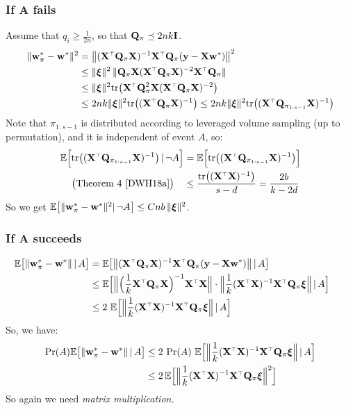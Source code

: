 \documentclass{beamer}
\begin{document}
\begin{frame}
  \frametitle{If A fails}
  Assume that $q_i\geq \frac1{2n}$, so that $\mathbf Q_\pi\preceq 2nk\mathbf I$.
  \begin{align*}
    \|\w_\pi^*-\w^*\|^2
    &= \big\|(\X^\top\Q_\pi\X)^{-1}\X^\top\Q_\pi(\y -
      \X\w^*)\big\|^2\\
    &\leq
      \|\xib\|^2\,\|\Q_\pi\X(\X^\top\Q_\pi\X)^{-2}\X^\top\Q_\pi\|\\
    &\leq
      \|\xib\|^2\tr\big(\X^\top\Q_\pi^2\X(\X^\top\Q_\pi\X)^{-2}\big)\\
    &\leq 2nk  \|\xib\|^2\tr\big((\X^\top\Q_\pi\X)^{-1}\big)
      \leq 2nk  \|\xib\|^2\tr\big((\X^\top\Q_{\pi_{1:s-1}}\X)^{-1}\big)
  \end{align*}
  Note that $\pi_{1:s-1}$ is distributed according to leveraged volume
sampling (up to permutation), and it is independent of event $A$, so:
\begin{align*}
  \E\Big[\tr\big((\X^\top\Q_{\pi_{1:s-1}}\X)^{-1}\big)\,|\,\neg A\Big]
  &=\E\Big[\tr\big((\X^\top\Q_{\pi_{1:s-1}}\X)^{-1}\big)\Big]\\
\big(\text{Theorem 4 [DWH18a]}\big)\quad  &\leq \frac{\tr\big((\X^\top\X)^{-1}\big)}{s-d}= \frac{2b}{k-2d}
\end{align*}
So we get $\mathbb E\big[\|\mathbf w_\pi^*-\mathbf w^*\|^2|\,\neg A\big]\leq Cnb\,\|\boldsymbol\xi\|^2$.
\end{frame}

\begin{frame}
  \frametitle{If A succeeds}
  \begin{align*}
\hspace{-6mm}    \E\big[\|\w_\pi^*-\w^*\|\,|\,A\big]
    &= \E\big[\big\|(\X^\top\Q_\pi\X)^{-1}\X^\top\Q_\pi(\y - \X\w^*)\big\|\,|\,A\big]\\
    &\leq
      \E\Big[\Big\|\Big(\frac1k\X^\top\Q_\pi\X\Big)^{-1}\X^\top\X\Big\|\cdot
      \Big\|\frac1k(\X^\top\X)^{-1}\X^\top\Q_\pi
      \xib\Big\|\,|\,A\Big]\\
    &\leq 2\ \E\Big[\Big\|\frac1k(\X^\top\X)^{-1}\X^\top\Q_\pi
      \xib\Big\|\,|\,A\Big]
  \end{align*}
  So, we have:
  \begin{align*}
    \Pr(A)\E\big[\|\w_\pi^*-\w^*\|\,|\,A\big]
    &\leq 2\ \Pr(A)\ \E\Big[\Big\|\frac1k(\X^\top\X)^{-1}\X^\top\Q_\pi
    \xib\Big\|\,|\,A\Big]\\
    &\leq2\, \E\Big[\Big\|\frac1k(\X^\top\X)^{-1}\X^\top\Q_\pi
    \xib\Big\|^2\Big]
    \end{align*}
  So again we need \textit{matrix multiplication}.
  \end{frame}
\end{document}
